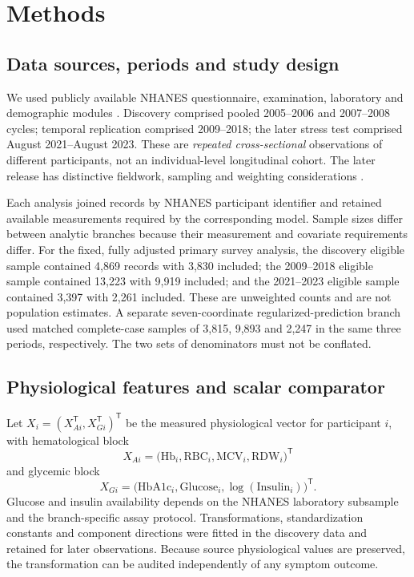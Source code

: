 \documentclass[11pt,a4paper]{article}
\begin{document}
\section{Methods}
\subsection{Data sources, periods and study design}
We used publicly available NHANES questionnaire, examination, laboratory and demographic modules \cite{nhanesportal}. Discovery comprised pooled 2005--2006 and 2007--2008 cycles; temporal replication comprised 2009--2018; the later stress test comprised August 2021--August 2023. These are \emph{repeated cross-sectional} observations of different participants, not an individual-level longitudinal cohort. The later release has distinctive fieldwork, sampling and weighting considerations \cite{nhanes2123}.

Each analysis joined records by NHANES participant identifier and retained available measurements required by the corresponding model. Sample sizes differ between analytic branches because their measurement and covariate requirements differ. For the fixed, fully adjusted primary survey analysis, the discovery eligible sample contained 4,869 records with 3,830 included; the 2009--2018 eligible sample contained 13,223 with 9,919 included; and the 2021--2023 eligible sample contained 3,397 with 2,261 included. These are unweighted counts and are not population estimates. A separate seven-coordinate regularized-prediction branch used matched complete-case samples of 3,815, 9,893 and 2,247 in the same three periods, respectively. The two sets of denominators must not be conflated.

\subsection{Physiological features and scalar comparator}
Let $X_i=(X_{Ai}^{\mathsf T},X_{Gi}^{\mathsf T})^{\mathsf T}$ be the measured physiological vector for participant $i$, with hematological block
\begin{equation}
X_{Ai}=\big(\mathrm{Hb}_i,\mathrm{RBC}_i,\mathrm{MCV}_i,\mathrm{RDW}_i\big)^{\mathsf T}
\end{equation}
and glycemic block
\begin{equation}
X_{Gi}=\big(\mathrm{HbA1c}_i,\mathrm{Glucose}_i,\log(\mathrm{Insulin}_i)\big)^{\mathsf T}.
\end{equation}
Glucose and insulin availability depends on the NHANES laboratory subsample and the branch-specific assay protocol. Transformations, standardization constants and component directions were fitted in the discovery data and retained for later observations. Because source physiological values are preserved, the transformation can be audited independently of any symptom outcome.
\end{document}
